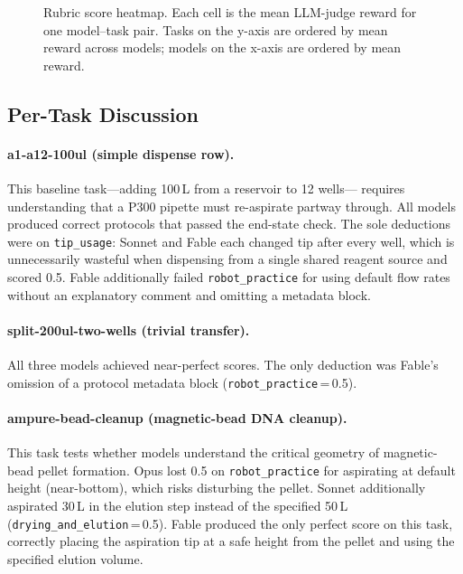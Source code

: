 \documentclass[11pt,a4paper]{article}
\begin{document}
\begin{figure}[H]
\centering
\caption{Rubric score heatmap. Each cell is the mean LLM-judge reward for
one model--task pair. Tasks on the y-axis are ordered by mean reward across
models; models on the x-axis are ordered by mean reward.}
\label{fig:heatmap}
\end{figure}

\subsection{Per-Task Discussion}
\label{sec:pertask}

\paragraph{a1-a12-100ul (simple dispense row).}
This baseline task---adding 100\,\textmu L from a reservoir to 12 wells---
requires understanding that a P300 pipette must re-aspirate partway through.
All models produced correct protocols that passed the end-state check.
The sole deductions were on \texttt{tip\_usage}: Sonnet and Fable each
changed tip after every well, which is unnecessarily wasteful when dispensing
from a single shared reagent source and scored 0.5.
Fable additionally failed \texttt{robot\_practice} for using default flow
rates without an explanatory comment and omitting a metadata block.

\paragraph{split-200ul-two-wells (trivial transfer).}
All three models achieved near-perfect scores.
The only deduction was Fable's omission of a protocol metadata block
(\texttt{robot\_practice}\,=\,0.5).

\paragraph{ampure-bead-cleanup (magnetic-bead DNA cleanup).}
This task tests whether models understand the critical geometry of
magnetic-bead pellet formation.
Opus lost 0.5 on \texttt{robot\_practice} for aspirating at default height
(near-bottom), which risks disturbing the pellet.
Sonnet additionally aspirated 30\,\textmu L in the elution step instead of
the specified 50\,\textmu L (\texttt{drying\_and\_elution}\,=\,0.5).
Fable produced the only perfect score on this task, correctly placing the
aspiration tip at a safe height from the pellet and using the specified
elution volume.
\end{document}
